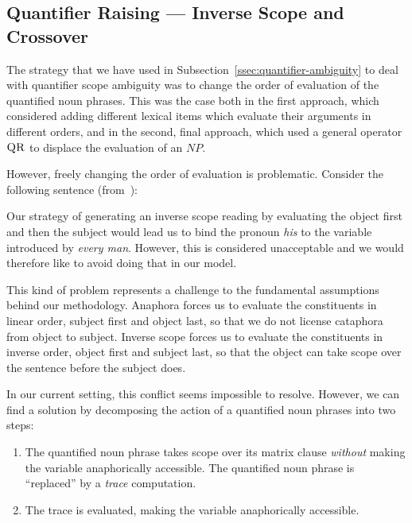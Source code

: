 \subsection{Quantifier Raising --- Inverse Scope and Crossover}
\label{ssec:crossover}

The strategy that we have used in
Subsection~\ref{ssec:quantifier-ambiguity} to deal with quantifier scope
ambiguity was to change the order of evaluation of the quantified noun
phrases. This was the case both in the first approach, which considered
adding different lexical items which evaluate their arguments in different
orders, and in the second, final approach, which used a general operator
$\textsc{QR}$ to displace the evaluation of an $NP$.

However, freely changing the order of evaluation is problematic. Consider
the following sentence (from~\cite{shan2006explaining}):

\begin{exe}
\end{exe}

Our strategy of generating an inverse scope reading by evaluating the
object first and then the subject would lead us to bind the pronoun
\emph{his} to the variable introduced by \emph{every man}. However, this is
considered unacceptable and we would therefore like to avoid doing that in
our model.

This kind of problem represents a challenge to the fundamental assumptions
behind our methodology. Anaphora forces us to evaluate the constituents in
linear order, subject first and object last, so that we do not license
cataphora from object to subject. Inverse scope forces us to evaluate the
constituents in inverse order, object first and subject last, so that the
object can take scope over the sentence before the subject does.

In our current setting, this conflict seems impossible to resolve. However,
we can find a solution by decomposing the action of a quantified noun
phrases into two steps:

\begin{enumerate}
\item The quantified noun phrase takes scope over its matrix clause
  \emph{without} making the variable anaphorically accessible. The
  quantified noun phrase is ``replaced'' by a \emph{trace}
  computation.
\item The trace is evaluated, making the variable anaphorically accessible.
\end{enumerate}

